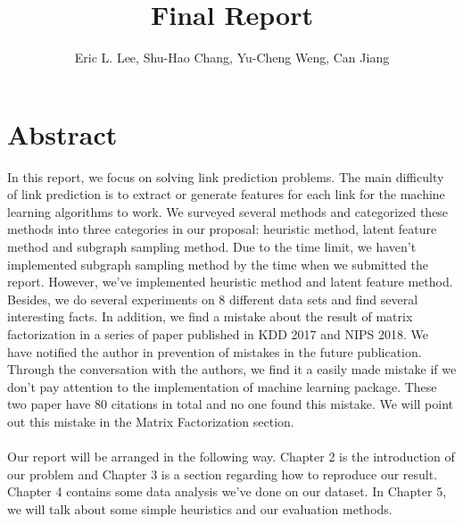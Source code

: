 \documentclass[12pt]{article}
\begin{document}
 
\title{Final Report}
\author{Eric L. Lee, Shu-Hao Chang, Yu-Cheng Weng, Can Jiang} 
\maketitle

\section{Abstract}

In this report, we focus on solving link prediction problems. The main difficulty of link prediction is to extract or generate features for each link for the machine learning algorithms to work. We surveyed several methods and categorized these methods into three categories in our proposal: heuristic method, latent feature method and subgraph sampling method.
Due to the time limit, we haven't implemented subgraph sampling method by the time when we submitted the report. However, we've implemented heuristic method and latent feature method. Besides, we do several experiments on 8 different data sets and find several interesting facts. In addition, we find a mistake about the result of matrix factorization in a series of paper published in KDD 2017 and NIPS 2018. We have notified the author in prevention of mistakes in the future publication. Through the conversation with the authors, we find it a easily made mistake if we don't pay attention to the implementation of machine learning package. These two paper have 80 citations in total and no one found this mistake. We will point out this mistake in the Matrix Factorization section.
\\ \\
Our report will be arranged in the following way. Chapter 2 is the introduction of our problem and Chapter 3 is a section regarding how to reproduce our result. Chapter 4 contains some data analysis we've done on our dataset. In Chapter 5, we will talk about some simple heuristics and our evaluation methods. 
\end{document}
